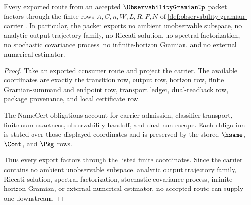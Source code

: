 \begin{theorem}
\label{thm:observability-gramian-ledger-nonescape}
Every exported route from an accepted $\ObservabilityGramianUp$ packet factors through the finite rows $A,C,n,W,L,R,P,N$ of \autoref{def:observability-gramian-carrier}. In particular, the packet exports no ambient unobservable subspace, no analytic output trajectory family, no Riccati solution, no spectral factorization, no stochastic covariance process, no infinite-horizon Gramian, and no external numerical estimator.
\end{theorem}
\begin{proof}
Take an exported consumer route and project the carrier. The available coordinates are exactly the transition row, output row, horizon row, finite Gramian-summand and endpoint row, transport ledger, dual-readback row, package provenance, and local certificate row.

The NameCert obligations account for carrier admission, classifier transport, finite sum exactness, observability handoff, and dual non-escape. Each obligation is stated over those displayed coordinates and is preserved by the stored $\hsame$, $\Cont$, and $\Pkg$ rows.

Thus every export factors through the listed finite coordinates. Since the carrier contains no ambient unobservable subspace, analytic output trajectory family, Riccati solution, spectral factorization, stochastic covariance process, infinite-horizon Gramian, or external numerical estimator, no accepted route can supply one downstream.
\end{proof}


\begin{closurestatus}{\ObservabilityGramianUp}
  \theoryclosure{\seedClosure}
  \formalstatus{\unformalizedV}
\end{closurestatus}
